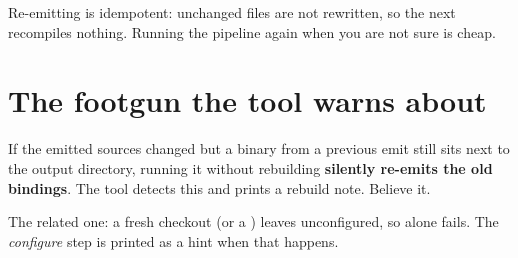 \begin{note}
Re-emitting is idempotent: unchanged files are not rewritten, so the next
 recompiles nothing. Running the pipeline again when you
are not sure is cheap.
\end{note}

\section{The footgun the tool warns about}

If the emitted sources changed but a  binary from a previous
emit still sits next to the output directory, running it without rebuilding
\textbf{silently re-emits the old bindings}. The tool detects this and prints a
rebuild note. Believe it.

The related one: a fresh checkout (or a ) leaves
 unconfigured, so  alone fails. The
\emph{configure} step is printed as a  hint when that happens.
